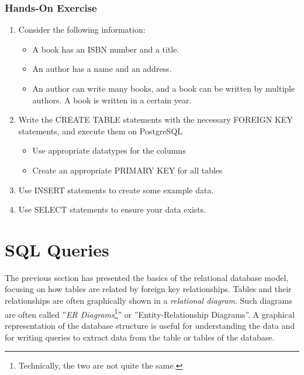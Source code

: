 \begin{tcolorbox}[colback=code]
\subsubsection*{Hands-On Exercise}
\begin{enumerate}
  \item Consider the following information:
	\begin{itemize}
	  \item A book has an ISBN number and a title. 
	  \item An author has a name and an address. 
	  \item An author can write many books, and a book can be written by multiple authors. A book is written in a certain year.
	\end{itemize}
  \item Write the CREATE TABLE statements with the necessary FOREIGN KEY statements, and execute them on PostgreSQL
  \begin{itemize}
    \item Use appropriate datatypes for the columns
    \item Create an appropriate PRIMARY KEY for all tables
  \end{itemize}
  \item Use INSERT statements to create some example data.
  \item Use SELECT statements to ensure your data exists.
\end{enumerate}
\end{tcolorbox}

\section{SQL Queries}

The previous section has presented the basics of the relational database model, focusing on how tables are related by foreign key relationships. Tables and their relationships are often graphically shown in a \emph{relational diagram}. Such diagrams are often called ''\emph{ER Diagrams}\footnote{Technically, the two are not quite the same.}'' or ''Entity-Relationship Diagrams''. A graphical representation of the database structure is useful for understanding the data and for writing queries to extract data from the table or tables of the database. 

